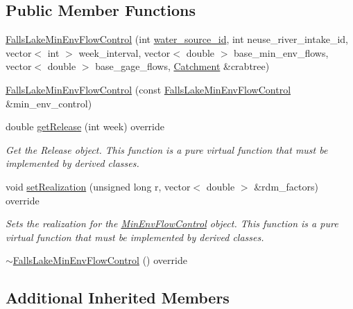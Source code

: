 \subsection*{Public Member Functions}
\begin{DoxyCompactItemize}
\item 
\mbox{\hyperlink{classFallsLakeMinEnvFlowControl_a9cef248e2fd8a194c92454a79398a6a6}{Falls\+Lake\+Min\+Env\+Flow\+Control}} (int \mbox{\hyperlink{classMinEnvFlowControl_aada518a047598f386daec1d0358023aa}{water\+\_\+source\+\_\+id}}, int neuse\+\_\+river\+\_\+intake\+\_\+id, vector$<$ int $>$ week\+\_\+interval, vector$<$ double $>$ base\+\_\+min\+\_\+env\+\_\+flows, vector$<$ double $>$ base\+\_\+gage\+\_\+flows, \mbox{\hyperlink{classCatchment}{Catchment}} \&crabtree)
\item 
\mbox{\hyperlink{classFallsLakeMinEnvFlowControl_a0ac46bcd8bea2e6e56824b5398129418}{Falls\+Lake\+Min\+Env\+Flow\+Control}} (const \mbox{\hyperlink{classFallsLakeMinEnvFlowControl}{Falls\+Lake\+Min\+Env\+Flow\+Control}} \&min\+\_\+env\+\_\+control)
\item 
double \mbox{\hyperlink{classFallsLakeMinEnvFlowControl_a50453b443fb6e5869fcfc9a183f42b2f}{get\+Release}} (int week) override
\begin{DoxyCompactList}\small\item\em Get the Release object. This function is a pure virtual function that must be implemented by derived classes. \end{DoxyCompactList}\item 
void \mbox{\hyperlink{classFallsLakeMinEnvFlowControl_a6ea8a5e9ff9179066cceb77d896f3f97}{set\+Realization}} (unsigned long r, vector$<$ double $>$ \&rdm\+\_\+factors) override
\begin{DoxyCompactList}\small\item\em Sets the realization for the {\ttfamily \mbox{\hyperlink{classMinEnvFlowControl}{Min\+Env\+Flow\+Control}}} object. This function is a pure virtual function that must be implemented by derived classes. \end{DoxyCompactList}\item 
\mbox{\hyperlink{classFallsLakeMinEnvFlowControl_a747aefedd1e590007206ef08145be351}{$\sim$\+Falls\+Lake\+Min\+Env\+Flow\+Control}} () override
\end{DoxyCompactItemize}
\subsection*{Additional Inherited Members}


